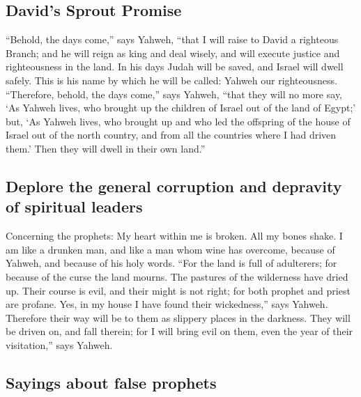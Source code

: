 \hypertarget{davids-sprout-promise}{%
\subsection{David's Sprout Promise}\label{davids-sprout-promise}}

 ``Behold, the days come,'' says Yahweh, ``that I will
raise to David a righteous Branch; and he will reign as king and deal
wisely, and will execute justice and righteousness in the land.
 In his days Judah will be saved, and Israel will dwell
safely. This is his name by which he will be called: Yahweh our
righteousness.  ``Therefore, behold, the days come,'' says
Yahweh, ``that they will no more say, `As Yahweh lives, who brought up
the children of Israel out of the land of Egypt;'  but,
`As Yahweh lives, who brought up and who led the offspring of the house
of Israel out of the north country, and from all the countries where I
had driven them.' Then they will dwell in their own land.''

\hypertarget{deplore-the-general-corruption-and-depravity-of-spiritual-leaders}{%
\subsection{Deplore the general corruption and depravity of spiritual
leaders}\label{deplore-the-general-corruption-and-depravity-of-spiritual-leaders}}

 Concerning the prophets: My heart within me is broken.
All my bones shake. I am like a drunken man, and like a man whom wine
has overcome, because of Yahweh, and because of his holy words.
 ``For the land is full of adulterers; for because of the
curse the land mourns. The pastures of the wilderness have dried up.
Their course is evil, and their might is not right;  for
both prophet and priest are profane. Yes, in my house I have found their
wickedness,'' says Yahweh.  Therefore their way will be
to them as slippery places in the darkness. They will be driven on, and
fall therein; for I will bring evil on them, even the year of their
visitation,'' says Yahweh.

\hypertarget{sayings-about-false-prophets}{%
\subsection{Sayings about false
prophets}\label{sayings-about-false-prophets}}

